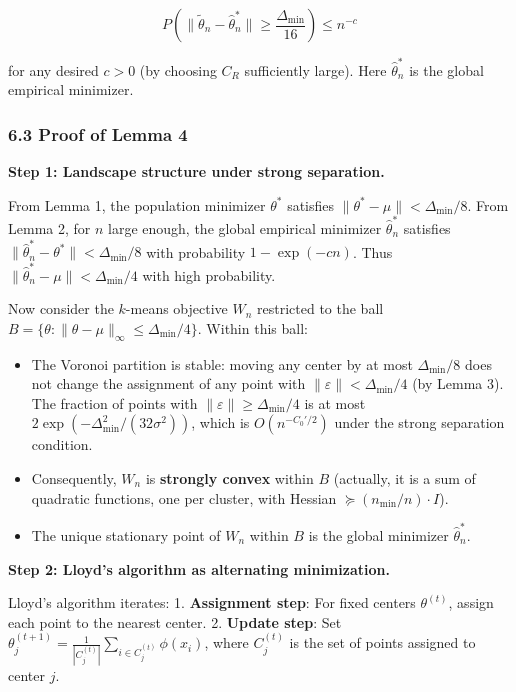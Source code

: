 \documentclass[
  12pt,
]{ctexart}
\providecommand{\tightlist}{%
  \setlength{\itemsep}{0pt}\setlength{\parskip}{0pt}}
\begin{document}
\[P\left(\|\tilde{\theta}_n - \hat{\theta}_n^*\| \geq \frac{\Delta_{\min}}{16}\right) \leq n^{-c}\]

for any desired \(c > 0\) (by choosing \(C_R\) sufficiently large). Here
\(\hat{\theta}_n^*\) is the global empirical minimizer.

\subsubsection{6.3 Proof of Lemma 4}\label{proof-of-lemma-4}

\textbf{Step 1: Landscape structure under strong separation.}

From Lemma 1, the population minimizer \(\theta^*\) satisfies
\(\|\theta^* - \mu\| < \Delta_{\min}/8\). From Lemma 2, for \(n\) large
enough, the global empirical minimizer \(\hat{\theta}_n^*\) satisfies
\(\|\hat{\theta}_n^* - \theta^*\| < \Delta_{\min}/8\) with probability
\(1 - \exp(-c n)\). Thus
\(\|\hat{\theta}_n^* - \mu\| < \Delta_{\min}/4\) with high probability.

Now consider the \(k\)-means objective \(W_n\) restricted to the ball
\(B = \{\theta : \|\theta - \mu\|_\infty \leq \Delta_{\min}/4\}\).
Within this ball:

\begin{itemize}
\tightlist
\item
  The Voronoi partition is stable: moving any center by at most
  \(\Delta_{\min}/8\) does not change the assignment of any point with
  \(\|\varepsilon\| < \Delta_{\min}/4\) (by Lemma 3). The fraction of
  points with \(\|\varepsilon\| \geq \Delta_{\min}/4\) is at most
  \(2\exp(-\Delta_{\min}^2/(32\sigma^2))\), which is \(O(n^{-C_0'/2})\)
  under the strong separation condition.
\item
  Consequently, \(W_n\) is \textbf{strongly convex} within \(B\)
  (actually, it is a sum of quadratic functions, one per cluster, with
  Hessian \(\succeq (n_{\min}/n) \cdot I\)).
\item
  The unique stationary point of \(W_n\) within \(B\) is the global
  minimizer \(\hat{\theta}_n^*\).
\end{itemize}

\textbf{Step 2: Lloyd's algorithm as alternating minimization.}

Lloyd's algorithm iterates: 1. \textbf{Assignment step}: For fixed
centers \(\theta^{(t)}\), assign each point to the nearest center. 2.
\textbf{Update step}: Set
\(\theta_j^{(t+1)} = \frac{1}{|C_j^{(t)}|} \sum_{i \in C_j^{(t)}} \phi(x_i)\),
where \(C_j^{(t)}\) is the set of points assigned to center \(j\).
\end{document}

